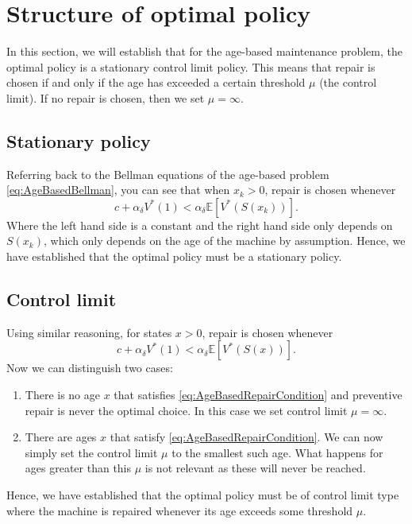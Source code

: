 \section{Structure of optimal policy}
In this section, we will establish that for the age-based maintenance problem, the optimal policy is a stationary control limit policy.
This means that repair is chosen if and only if the age has exceeded a certain threshold $\mu$ (the control limit).
If no repair is chosen, then we set $\mu=\infty$.

\subsection{Stationary policy}
Referring back to the Bellman equations of the age-based problem \eqref{eq:AgeBasedBellman}, you can see that when $x_k>0$, repair is chosen whenever
\[ c+\alpha_\delta V^*(1) <\alpha_\delta \mathbb{E}[V^*(S(x_k))]. \]
Where the left hand side is a constant and the right hand side only depends on $S(x_k)$, which only depends on the age of the machine by assumption.
Hence, we have established that the optimal policy must be a stationary policy.

\subsection{Control limit}
Using similar reasoning, for states $x>0$, repair is chosen whenever
\begin{equation}\label{eq:AgeBasedRepairCondition}
 c+\alpha_\delta V^*(1) <\alpha_\delta \mathbb{E}[V^*(S(x))]. 
 \end{equation}
Now we can distinguish two cases:
\begin{enumerate}
	\item There is no age $x$ that satisfies \eqref{eq:AgeBasedRepairCondition} and preventive repair is never the optimal choice.
	In this case we set control limit $\mu=\infty$.
	\item There are ages $x$ that satisfy \eqref{eq:AgeBasedRepairCondition}.
	We can now simply set the control limit $\mu$ to the smallest such age.
	What happens for ages greater than this $\mu$ is not relevant as these will never be reached.
\end{enumerate}
Hence, we have established that the optimal policy must be of control limit type where the machine is repaired whenever its age exceeds some threshold $\mu$.